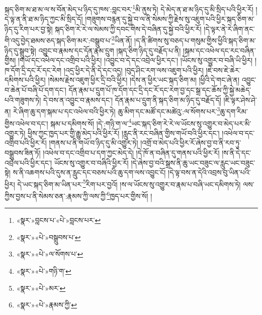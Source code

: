 སྐད་ཅིག་མ་ཐ་མ་ལ་ས་བོན་མེད་པ་ཉིད་དུ་ཁས་:བླང་བར་\footnote{«སྣར་»བླངས་པ་«པེ་»བླངས་པར་}མི་ནུས་ཏེ། དེ་མེད་ན་ཐ་མ་ཉིད་དུ་མི་སྲིད་པའི་ཕྱིར་རོ། །དེ་ལྟ་ན་ནི་ཐ་མ་ཉིད་ཀྱང་མི་སྲིད་དོ། །གཟུགས་བརྙན་དུ་སྐྱེ་བ་ལ་ནི་སེམས་ཀྱི་རྗེས་སུ་འཇུག་པའི་ཕྱིར་སྐད་ཅིག་མ་ཉིད་དུ་རིག་པར་བྱ་སྟེ། སྐད་ཅིག་རེ་རེ་ལ་སེམས་ཀྱི་དབང་གིས་དེ་བཞིན་དུ་སྐྱེ་བའི་ཕྱིར་རོ། །དེ་ལྟར་ནེ་རེ་ཞིག་ནང་གི་འདུ་བྱེད་ཐམས་ཅད་སྐད་ཅིག་མར་:བསྒྲུབ་པ་\footnote{«སྣར་»«པེ་»བསྒྲུབས་པ་}ཡིན་ནོ། །ད་ནི་ཚིགས་སུ་བཅད་པ་གསུམ་གྱིས་ཕྱིའི་སྐད་ཅིག་མ་ཉིད་དུ་སྒྲུབ་སྟེ། འབྱུང་བ་རྣམས་དང་དོན་རྣམ་དྲུག །སྐད་ཅིག་ཉིད་དུ་བརྗོད་པ་ནི། །སྐམ་དང་འཕེལ་དང་རང་བཞིན་གྱིས། །གཡོ་དང་འཕེལ་དང་འགྲིབ་པའི་ཕྱིར། །འབྱུང་བ་དེ་དང་འབྲེལ་ཕྱིར་དང་། །ཡོངས་སུ་འགྱུར་བ་བཞི་ཡི་ཕྱིར། །ཁ་དོག་དྲི་དང་རོ་དང་རེག །འདྲ་ཕྱིར་དེ་ནི་དེ་དང་འདྲ། །བུད་ཤིང་རག་ལས་འཇུག་པའི་ཕྱིར། །ཇེ་བས་ཇེ་ཆེར་དམིགས་པའི་ཕྱིར། །སེམས་རྗེས་འཇུག་ཕྱིར་དྲི་བའི་ཕྱིར། །དེས་ན་ཕྱིར་ཡང་སྐད་ཅིག་མ། །ཕྱིའི་དེ་གང་ཞེ་ན། འབྱུང་བ་ཆེན་པོ་བཞི་པོ་དག་དང་། དོན་རྣམ་པ་དྲུག་པོ་ཁ་དོག་དང་དྲི་དང་རོ་དང་རེག་བྱ་དང་སྒྲ་དང་ཆོས་ཀྱི་སྐྱེ་མཆེད་པའི་གཟུགས་ཏེ། དེ་བས་ན་འབྱུང་བ་རྣམས་དང་། དོན་རྣམ་པ་དྲུག་ནི་སྐད་ཅིག་མ་ཉིད་དུ་བརྗོད་དོ། །ཇི་ལྟར་ཤེས་ཤེ་ན། རེ་ཞིག་ཆུ་དག་སྐམ་པ་དང་འཕེལ་བའི་ཕྱིར་ཏེ། ཆུ་མིག་དང་མཚོ་དང་མཚེའུ་:ལ་སོགས་པར་\footnote{«སྣར་»«པེ་»ལ་སོགས་པ་}ཆུ་དག་རིམ་གྱིས་འཕེལ་བ་དང་། སྐམ་པ་དམིགས་སོ། །དེ་:གཉི་ག་ལ་\footnote{«སྣར་»«པེ་»གཉི་ག་}ཡང་སྐད་ཅིག་རེ་རེ་ལ་ཡོངས་སུ་འགྱུར་བ་མེད་པར་མི་འགྱུར་ཏེ། ཕྱིས་ཀྱང་ཁྱད་པར་གྱི་རྒྱུ་མེད་པའི་ཕྱིར་རོ། །རླུང་ནི་རང་བཞིན་གྱིས་གཡོ་བའི་ཕྱིར་དང་། །འཕེལ་བ་དང་འགྲིབ་པའི་ཕྱིར་རོ། །གནས་པ་ནི་གཡོ་བ་ཉིད་དུ་མི་འགྱུར་ཏེ། །འགྲོ་བ་མེད་པའི་ཕྱིར་རོ་ཞེས་བྱ་བ་ནི་རབ་ཏུ་བསྒྲུབས་ཟིན་ཏོ། །འཕེལ་བ་དང་འགྲིབ་པ་དག་ཀྱང་མེད་དེ། །དེ་ཁོ་ན་བཞིན་དུ་གནས་པའི་ཕྱིར་རོ། །ས་ནི་དེ་དང་འབྲེལ་པའི་ཕྱིར་དང་། ཡོངས་སུ་འགྱུར་བ་བཞིའི་ཕྱིར་རོ། །དེ་ཞེས་བྱ་བའི་སྒྲས་ནི་ཆུ་ཡང་བཟུང་ལ་རླུང་ཡང་བཟུང་སྟེ། ས་ནི་འཆགས་པའི་དུས་ན་རླུང་དང་བཅས་པའི་ཆུ་དག་ལས་འབྱུང་ངོ། །དེ་ལྟ་བས་ན་དེའི་འབྲས་བུ་ཡིན་པའི་ཕྱིར། དེ་ཡང་སྐད་ཅིག་མ་ཡིན་པར་\footnote{«སྣར་»«པེ་»མར་}རིག་པར་བྱའོ། །ས་ལ་ཡོངས་སུ་འགྱུར་བ་རྣམ་པ་བཞི་ཡང་དམིགས་ཏེ། ལས་ཀྱིས་བྱས་པ་ནི་སེམས་ཅན་:རྣམས་ཀྱི་ལས་ཀྱི་\footnote{«སྣར་»«པེ་»རྣམས་ཀྱི་}ཁྱད་པར་གྱིས་སོ། །
